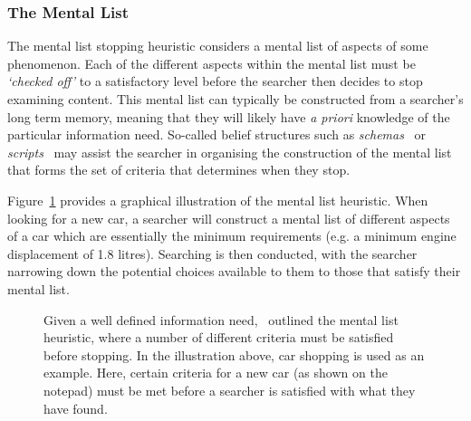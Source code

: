 \subsubsection{The Mental List}\label{sec:stopping_background:heuristics:mental}
The mental list stopping heuristic considers a mental list of aspects of some phenomenon. Each of the different aspects within the mental list must be \emph{`checked off'} to a satisfactory level before the searcher then decides to stop examining content. This mental list can typically be constructed from a searcher's long term memory, meaning that they will likely have \emph{a priori} knowledge of the particular information need. So-called belief structures such as \emph{schemas}~\citep{bartlett1933remembering} or \emph{scripts}~\citep{schank1977scripts} may assist the searcher in organising the construction of the mental list that forms the set of criteria that determines when they stop.

Figure~\ref{fig:mental_list} provides a graphical illustration of the mental list heuristic. When looking for a new car, a searcher will construct a mental list of different aspects of a car which are essentially the minimum requirements (e.g. a minimum engine displacement of 1.8 litres). Searching is then conducted, with the searcher narrowing down the potential choices available to them to those that satisfy their mental list.

\begin{figure}[t!]
    \centering
    \caption[The mental list stopping heuristic]{Given a well defined information need,~\cite{nickles1995judgment} outlined the mental list heuristic, where a number of different criteria must be satisfied before stopping. In the illustration above, car shopping is used as an example. Here, certain criteria for a new car (as shown on the notepad) must be met before a searcher is satisfied with what they have found.}
    \label{fig:mental_list}
\end{figure}

